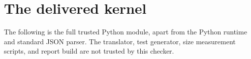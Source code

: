 \documentclass[11pt]{article}
\theoremstyle{definition}\newtheorem{definition}[theorem]{Definition}
\begin{document}
\clearpage
\appendix
\section{The delivered kernel}
The following is the full trusted Python module, apart from the Python
runtime and standard JSON parser. The translator, test generator, size
measurement scripts, and report build are not trusted by this checker.

\end{document}

